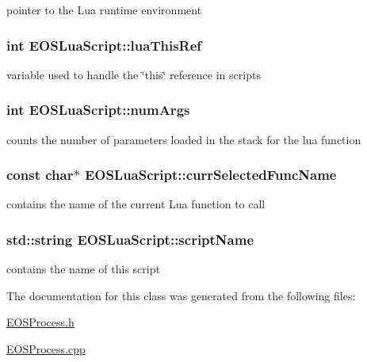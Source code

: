 pointer to the Lua runtime environment 

\hypertarget{classEOSLuaScript_6ce277b904132a14459a929d6d8a5903}{
\subsubsection[{luaThisRef}]{\setlength{\rightskip}{0pt plus 5cm}int {\bf EOSLuaScript::luaThisRef}}}
\label{classEOSLuaScript_6ce277b904132a14459a929d6d8a5903}


variable used to handle the \char`\"{}this\char`\"{} reference in scripts 

\hypertarget{classEOSLuaScript_b86282ecf112d657fd92b29b4e21a40e}{
\subsubsection[{numArgs}]{\setlength{\rightskip}{0pt plus 5cm}int {\bf EOSLuaScript::numArgs}}}
\label{classEOSLuaScript_b86282ecf112d657fd92b29b4e21a40e}


counts the number of parameters loaded in the stack for the lua function 

\hypertarget{classEOSLuaScript_f4fddb1fd2af7b266cb7b41f6b50a047}{
\subsubsection[{currSelectedFuncName}]{\setlength{\rightskip}{0pt plus 5cm}const char$\ast$ {\bf EOSLuaScript::currSelectedFuncName}}}
\label{classEOSLuaScript_f4fddb1fd2af7b266cb7b41f6b50a047}


contains the name of the current Lua function to call 

\hypertarget{classEOSLuaScript_7ca6cc5f26c5cfad510e9391e5815d8c}{
\subsubsection[{scriptName}]{\setlength{\rightskip}{0pt plus 5cm}std::string {\bf EOSLuaScript::scriptName}}}
\label{classEOSLuaScript_7ca6cc5f26c5cfad510e9391e5815d8c}


contains the name of this script 



The documentation for this class was generated from the following files:\begin{CompactItemize}
\item 
\hyperlink{EOSProcess_8h}{EOSProcess.h}\item 
\hyperlink{EOSProcess_8cpp}{EOSProcess.cpp}\end{CompactItemize}
